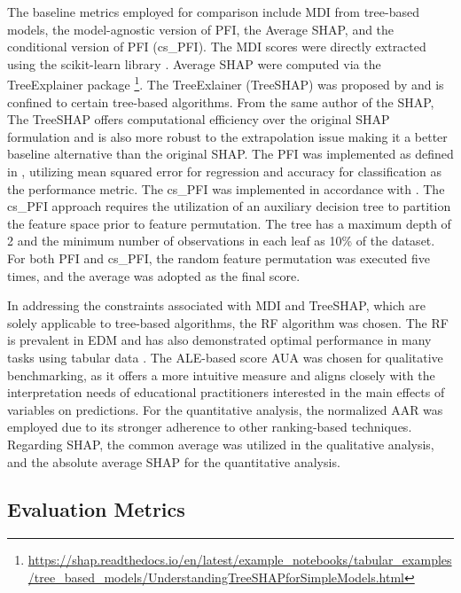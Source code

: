 The baseline metrics employed for comparison include  MDI from tree-based models, the model-agnostic version of PFI, the Average SHAP, and the conditional version of PFI (cs\_PFI). The MDI scores were directly extracted using the scikit-learn library \cite{scikit-learn}. Average SHAP were computed via the TreeExplainer package \footnote{\url{https://shap.readthedocs.io/en/latest/example\_notebooks/tabular\_examples/tree\_based_models/UnderstandingTreeSHAPforSimpleModels.html}}. The TreeExlainer (TreeSHAP)  was proposed by \cite{Lundberg2020FromTrees.} and is confined to certain tree-based algorithms. From the same author of the SHAP, The TreeSHAP offers computational efficiency over the original SHAP formulation and is also more robust to the extrapolation issue making it a better baseline alternative than the original SHAP. The PFI was implemented as defined in \cite{Fisher2018AllSimultaneously}, utilizing mean squared error for regression and accuracy for classification as the performance metric. The cs\_PFI was implemented in accordance with \cite{Molnar2023Model-agnosticApproach}. The cs\_PFI approach requires the utilization of an auxiliary decision tree to partition the feature space prior to feature permutation. The tree has a maximum depth of 2 and the minimum number of observations in each leaf as 10\% of the dataset. For both PFI and cs\_PFI, the random feature permutation was executed five times, and the average was adopted as the final score.

In addressing the constraints associated with MDI and TreeSHAP, which are solely applicable to tree-based algorithms, the RF algorithm was chosen. The RF is prevalent in EDM \cite{Martinez-Abad2020EducationalAssessment} and has also demonstrated optimal performance in many tasks using tabular data \cite{Grinsztajn2022WhyData}. The ALE-based score AUA was chosen for qualitative benchmarking, as it offers a more intuitive measure and aligns closely with the interpretation needs of educational practitioners interested in the main effects of variables on predictions. For the quantitative analysis, the normalized AAR was employed due to its stronger adherence to other ranking-based techniques. Regarding SHAP, the common average was utilized in the qualitative analysis, and the absolute average SHAP for the quantitative analysis.    

\subsection{Evaluation Metrics}


